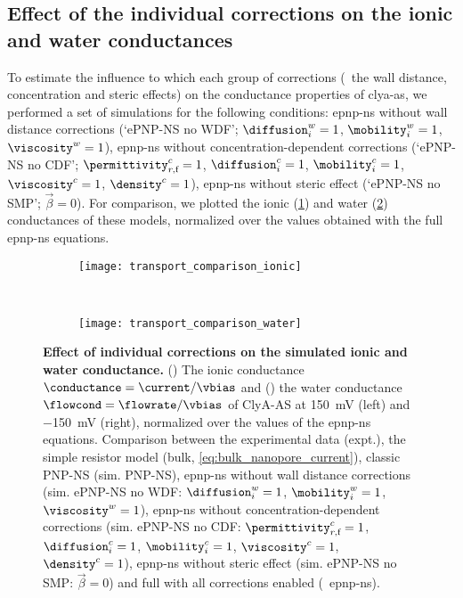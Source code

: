 \subsection{Effect of the individual corrections on the ionic and water conductances}
%
\label{sec:transport:comparison_corrections}
%

To estimate the influence to which each group of corrections (\ie~the wall distance, concentration and steric
effects) on the conductance properties of \gls{clya-as}, we performed a set of simulations for the following
conditions: \gls{epnp-ns} without wall distance corrections (`ePNP-NS no WDF'; $\diffusion_{i}^w=1$,
$\mobility_{i}^w=1$, $\viscosity^w=1$), \gls{epnp-ns} without concentration-dependent corrections (`ePNP-NS no
CDF'; $\permittivity_{r,\text{f}}^c=1$, $\diffusion_{i}^c=1$, $\mobility_{i}^c=1$, $\viscosity^c=1$,
$\density^c=1$), \gls{epnp-ns} without steric effect (`ePNP-NS no SMP'; $\vec{\beta}=0$). For comparison, we
plotted the ionic (\cref{fig:transport_comparison_ionic}) and water (\cref{fig:transport_comparison_water})
conductances of these models, normalized over the values obtained with the full \gls{epnp-ns} equations.

%
\begin{figure*}[p]
  \centering
  \begin{subfigure}[t]{11.5cm}
    \centering
    \caption{}\vspace{0mm}\label{fig:transport_comparison_ionic}
    \texttt{[image: transport\_comparison\_ionic]}
  \end{subfigure}
  \\
  \begin{subfigure}[t]{11.5cm}
    \centering
    \caption{}\vspace{0mm}\label{fig:transport_comparison_water}
    \texttt{[image: transport\_comparison\_water]}
  \end{subfigure}

  \caption[Effect of individ. corrections on the sim. ionic and water conductance]%
  {%
    \textbf{Effect of individual corrections on the simulated ionic and water conductance.}
    ()
    The ionic conductance $\conductance = \current / \vbias$ and
    ()
    the water conductance $\flowcond = \flowrate / \vbias$ of {ClyA-AS} at \SI{+150}{\mV} (left) and
    \SI{-150}{\mV} (right), normalized over the values of the \gls{epnp-ns} equations. Comparison between the
    experimental data (expt.), the simple resistor model (bulk, \cref{eq:bulk_nanopore_current}), classic
    {PNP-NS} ({sim. PNP-NS}), \gls{epnp-ns} without wall distance corrections ({sim. ePNP-NS no WDF}:
    $\diffusion_{i}^w=1$, $\mobility_{i}^w=1$, $\viscosity^w=1$), \gls{epnp-ns} without
    concentration-dependent corrections ({sim. ePNP-NS no CDF}: $\permittivity_{r,\text{f}}^c=1$,
    $\diffusion_{i}^c=1$, $\mobility_{i}^c=1$, $\viscosity^c=1$, $\density^c=1$), \gls{epnp-ns} without steric
    effect ({sim. ePNP-NS no SMP}: $\vec{\beta}=0$) and full with all corrections enabled (\ie~\gls{epnp-ns}).
  }\label{fig:transport_comparison}
\end{figure*}
%

